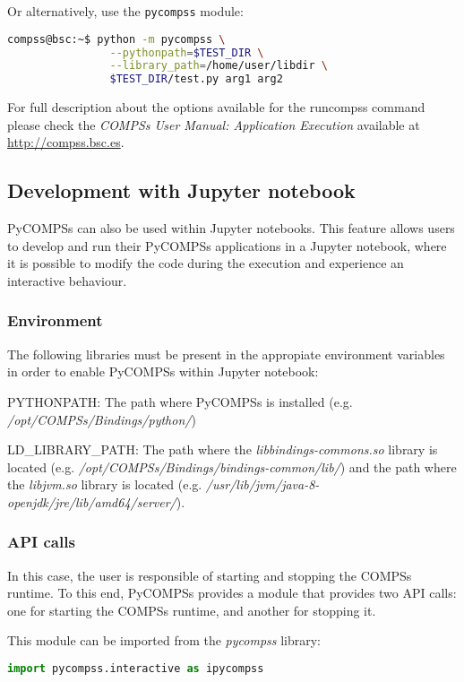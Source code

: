 Or alternatively, use the \verb|pycompss| module:

\begin{lstlisting}[language=bash]
compss@bsc:~$ python -m pycompss \
                --pythonpath=$TEST_DIR \
                --library_path=/home/user/libdir \
                $TEST_DIR/test.py arg1 arg2
\end{lstlisting}

For full description about the options available for the runcompss command please check the \textit{COMPSs User Manual: Application
Execution} available at \url{http://compss.bsc.es}. 

\subsection{Development with Jupyter notebook}

PyCOMPSs can also be used within Jupyter notebooks. 
This feature allows users to develop and run their PyCOMPSs applications in a Jupyter notebook, where it is possible to modify the code during the execution and experience an interactive behaviour.

\subsubsection{Environment}
The following libraries must be present in the appropiate environment variables in order to enable PyCOMPSs within Jupyter notebook:

PYTHONPATH: The path where PyCOMPSs is installed (e.g. \textit{/opt/COMPSs/Bindings/python/})

LD\_LIBRARY\_PATH: The path where the {\it libbindings-commons.so} library is located (e.g. \textit{/opt/COMPSs/Bindings/bindings-common/lib/}) and the path where the {\it libjvm.so} library is located (e.g. \textit{/usr/lib/jvm/java-8-openjdk/jre/lib/amd64/server/}).

\subsubsection{API calls}

In this case, the user is responsible of starting and stopping the COMPSs runtime.
To this end, PyCOMPSs provides a module that provides two API calls: one for starting the COMPSs runtime, and another for stopping it.

This module can be imported from the {\it pycompss} library:

\begin{lstlisting}[language=python]
import pycompss.interactive as ipycompss
\end{lstlisting}

